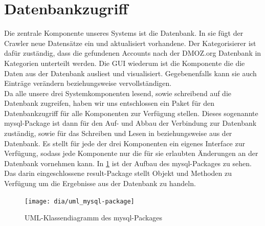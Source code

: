 \section{Datenbankzugriff}\label{sec:datenbankzugriff}
Die zentrale Komponente unseres Systems ist die Datenbank. In sie fügt der Crawler neue Datensätze ein und aktualisiert vorhandene. Der Kategorisierer ist dafür zuständig, dass die gefundenen Accounts nach der DMOZ.org Datenbank in Kategorien unterteilt werden. Die GUI wiederum ist die Komponente die die Daten aus der Datenbank ausliest und visualisiert. Gegebenenfalls kann sie auch Einträge verändern beziehungsweise vervollständigen.
\\Da alle unsere drei Systemkomponenten lesend, sowie schreibend auf die Datenbank zugreifen, haben wir uns entschlossen ein Paket für den Datenbankzugriff für alle Komponenten zur Verfügung stellen. Dieses sogenannte mysql-Package ist dann für den Auf- und Abbau der Verbindung zur Datenbank zuständig, sowie für das Schreiben und Lesen in beziehungsweise aus der Datenbank. Es stellt für jede der drei Komponenten ein eigenes Interface zur Verfügung, sodass jede Komponente nur die für sie erlaubten Änderungen an der Datenbank vornehmen kann.
In \cref{fig:mysql-package} ist der Aufbau des mysql-Packages zu sehen. Das darin eingeschlossene result-Package stellt Objekt und Methoden zu Verfügung um die Ergebnisse aus der Datenbank zu handeln.

\begin{figure}[h!]
	\centering
	\texttt{[image: dia/uml\_mysql-package]}
	\caption{UML-Klassendiagramm des mysql-Packages}
	\label{fig:mysql-package}
\end{figure}

